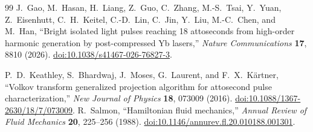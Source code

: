 \begin{thebibliography}{99}
J.~Gao, M.~Hasan, H.~Liang, Z.~Guo, C.~Zhang, M.-S.~Tsai,
Y.~Yuan, Z.~Eisenhutt, C.~H.~Keitel, C.-D.~Lin, C.~Jin,
Y.~Liu, M.-C.~Chen, and M.~Han,
``Bright isolated light pulses reaching 18 attoseconds from high-order harmonic generation by post-compressed Yb lasers,''
\emph{Nature Communications} \textbf{17}, 8810 (2026).
\href{https://doi.org/10.1038/s41467-026-76827-3}{doi:10.1038/s41467-026-76827-3}.

P.~D.~Keathley, S.~Bhardwaj, J.~Moses, G.~Laurent, and F.~X.~K\"artner,
``Volkov transform generalized projection algorithm for attosecond pulse characterization,''
\emph{New Journal of Physics} \textbf{18}, 073009 (2016).
\href{https://doi.org/10.1088/1367-2630/18/7/073009}{doi:10.1088/1367-2630/18/7/073009}.
\n{}
R.~Salmon,
``Hamiltonian fluid mechanics,''
\emph{Annual Review of Fluid Mechanics} \textbf{20}, 225--256 (1988).
\href{https://doi.org/10.1146/annurev.fl.20.010188.001301}{doi:10.1146/annurev.fl.20.010188.001301}.

\end{thebibliography}
